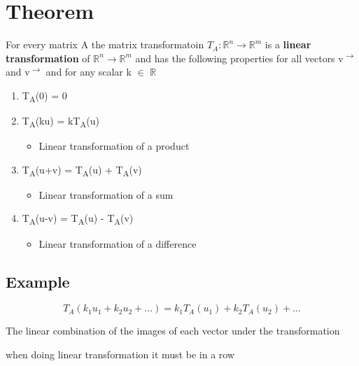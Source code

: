 \documentclass[11pt]{article}
\begin{document}
\section{Theorem}
\label{sec:org9164ed3}
For every matrix A the matrix transformatoin \(T_{A}: \mathbb{R}^{n} \rightarrow{} \mathbb{R}^{m}\) is a \textbf{linear transformation} of \(\mathbb{R}^{n} \rightarrow{} \mathbb{R}^{m}\) and has the following properties for all vectors v\textsuperscript{\(\rightarrow\)} and v\textsuperscript{\(\rightarrow\)} and for any scalar k \(\in\) \(\mathbb{R}\)
\begin{enumerate}
\item T\textsubscript{A}(0) = 0
\item T\textsubscript{A}(ku) = kT\textsubscript{A}(u)
\begin{itemize}
\item Linear transformation of a product
\end{itemize}
\item T\textsubscript{A}(u+v) = T\textsubscript{A}(u) + T\textsubscript{A}(v)
\begin{itemize}
\item Linear transformation of a sum
\end{itemize}
\item T\textsubscript{A}(u-v) = T\textsubscript{A}(u) - T\textsubscript{A}(v)
\begin{itemize}
\item Linear transformation of a difference
\end{itemize}
\end{enumerate}
\subsection{Example}
\label{sec:org367b63b}
\[
T_{A}(k_{1}u_{1}+k_{2}u_{2} + ...) = k_{1}T_{A}(u_{1}) + k_{2}T_{A}(u_{2}) + ...
\]

The linear combination of the images of each vector under the transformation

when doing linear transformation it must be in a row
\end{document}
